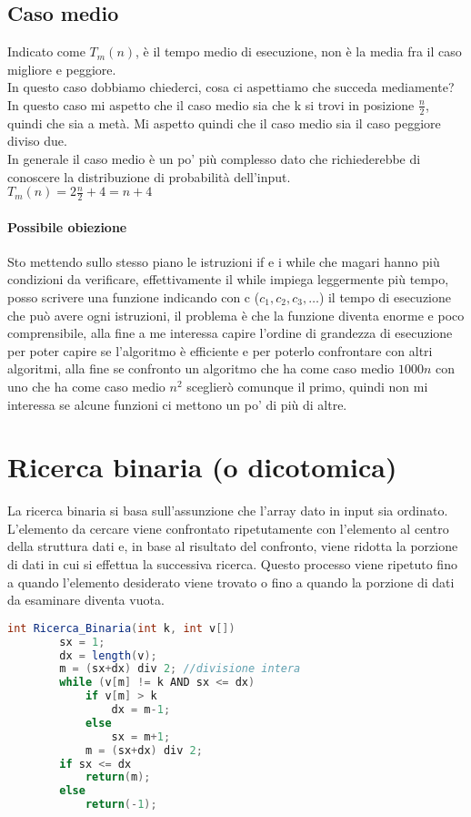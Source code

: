 \subsection{Caso medio}
Indicato come \textbf{$T_m(n)$}, è il tempo medio di esecuzione, non è la media fra il caso migliore e peggiore.\\
In questo caso dobbiamo chiederci, cosa ci aspettiamo che succeda mediamente?\\ In questo caso
mi aspetto che il caso medio sia che k si trovi in posizione $\frac{n}{2}$, quindi che sia a metà. Mi
aspetto quindi che il caso medio sia il caso peggiore diviso due.\\
In generale il caso medio è un po' più complesso dato che richiederebbe di conoscere la distribuzione
di probabilità dell'input.\\
$T_m(n)=2\frac{n}{2}+4=n+4$\\
\paragraph*{Possibile obiezione} Sto mettendo sullo stesso piano le istruzioni if e i while
che magari hanno più condizioni da verificare, effettivamente il while impiega leggermente
più tempo, posso scrivere una funzione indicando con c ($c_1, c_2, c_3, \dots$) il tempo di
esecuzione che può avere ogni istruzioni, il problema è che la funzione diventa enorme e poco
comprensibile, alla fine a me interessa capire l'ordine di grandezza di esecuzione per poter
capire se l'algoritmo è efficiente e per poterlo confrontare con altri algoritmi, alla fine
se confronto un algoritmo che ha come caso medio $1000n$ con uno che ha come caso medio $n^2$
sceglierò comunque il primo, quindi non mi interessa se alcune funzioni ci mettono un po' di più di
altre.

\section{Ricerca binaria (o dicotomica)}
La ricerca binaria si basa sull'assunzione che l'array dato in input sia ordinato.\\
L'elemento da cercare viene confrontato ripetutamente con l'elemento al centro 
della struttura dati e, in base al risultato del confronto, 
viene ridotta la porzione di dati in cui si effettua la successiva ricerca. 
Questo processo viene ripetuto fino a quando l'elemento desiderato viene trovato o 
fino a quando la porzione di dati da esaminare diventa vuota.
\begin{lstlisting}[language=Java]
    int Ricerca_Binaria(int k, int v[])
        sx = 1;
        dx = length(v);
        m = (sx+dx) div 2; //divisione intera
        while (v[m] != k AND sx <= dx)
            if v[m] > k
                dx = m-1;
            else 
                sx = m+1;
            m = (sx+dx) div 2;
        if sx <= dx
            return(m);
        else
            return(-1);
\end{lstlisting}
